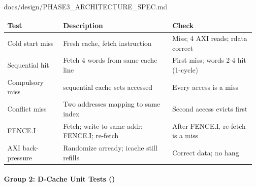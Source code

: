 \begin{relocated}{docs/design/PHASE3_ARCHITECTURE_SPEC.md}
{
\begin{longtable}[]{@{}
  >{\raggedright\arraybackslash}p{}
  >{\raggedright\arraybackslash}p{}
  >{\raggedright\arraybackslash}p{}@{}}
\toprule\noalign{}
\begin{minipage}[b]{\linewidth}\raggedright
Test
\end{minipage} & \begin{minipage}[b]{\linewidth}\raggedright
Description
\end{minipage} & \begin{minipage}[b]{\linewidth}\raggedright
Check
\end{minipage} \\
\midrule\noalign{}
\endhead
\bottomrule\noalign{}
\endlastfoot
Cold start miss & Fresh cache, fetch instruction & Miss; 4 AXI reads;
rdata correct \\
Sequential hit & Fetch 4 words from same cache line & First miss; words
2-4 hit (1-cycle) \\
Compulsory miss & 257 sequential cache sets accessed & Every access is a
miss \\
Conflict miss & Two addresses mapping to same index & Second access
evicts first \\
FENCE.I & Fetch; write to same addr; FENCE.I; re-fetch & After FENCE.I,
re-fetch is a miss \\
AXI back-pressure & Randomize arready; icache still refills & Correct
data; no hang \\
\end{longtable}
}

\paragraph{\texorpdfstring{Group 2: D-Cache Unit Tests
()}{Group 2: D-Cache Unit Tests ()}}\label{ds:ch:phase3-architecture:group-2-d-cache-unit-tests-test-dcachepy}


\end{relocated}
